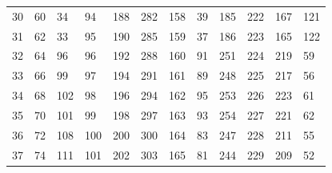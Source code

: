 \begin{table}[]
\begin{tabular}{llllllllllll}
30                     & 60                     & 34                     & 94                     & 188                    & 282                    & 158                    & 39                     & 185                    & 222                    & 167                    & 121                    \\
31                     & 62                     & 33                     & 95                     & 190                    & 285                    & 159                    & 37                     & 186                    & 223                    & 165                    & 122                    \\
32                     & 64                     & 96                     & 96                     & 192                    & 288                    & 160                    & 91                     & 251                    & 224                    & 219                    & 59                     \\
33                     & 66                     & 99                     & 97                     & 194                    & 291                    & 161                    & 89                     & 248                    & 225                    & 217                    & 56                     \\
34                     & 68                     & 102                    & 98                     & 196                    & 294                    & 162                    & 95                     & 253                    & 226                    & 223                    & 61                     \\
35                     & 70                     & 101                    & 99                     & 198                    & 297                    & 163                    & 93                     & 254                    & 227                    & 221                    & 62                     \\
36                     & 72                     & 108                    & 100                    & 200                    & 300                    & 164                    & 83                     & 247                    & 228                    & 211                    & 55                     \\
37                     & 74                     & 111                    & 101                    & 202                    & 303                    & 165                    & 81                     & 244                    & 229                    & 209                    & 52                     \\

\end{tabular}
\end{table}
